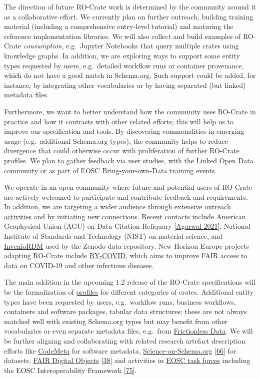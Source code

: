 The direction of future RO-Crate work is determined by the community
around it as a collaborative effort. We currently plan on further
outreach, building training material (including a comprehensive
entry-level tutorial) and maturing the reference implementation
libraries. We will also collect and build examples of RO-Crate
\emph{consumption}, e.g.~Jupyter Notebooks that query multiple crates
using knowledge graphs. In addition, we are exploring ways to support
some entity types requested by users, e.g.~detailed workflow runs or
container provenance, which do not have a good match in Schema.org. Such
support could be added, for instance, by integrating other vocabularies
or by having separated (but linked) metadata files.

Furthermore, we want to better understand how the community uses
RO-Crate in practice and how it contrasts with other related efforts;
this will help us to improve our specification and tools. By discovering
commonalities in emerging usage (e.g.~additional Schema.org types), the
community helps to reduce divergence that could otherwise occur with
proliferation of further RO-Crate profiles. We plan to gather feedback
via user studies, with the Linked Open Data community or as part of EOSC
Bring-your-own-Data training events.

We operate in an open community where future and potential users of
RO-Crate are actively welcomed to participate and contribute feedback
and requirements. In addition, we are targeting a wider audience through
extensive
\href{https://www.researchobject.org/ro-crate/outreach.html}{outreach
activities} and by initiating new connections. Recent contacts include
American Geophysical Union (AGU) on Data Citation Reliquary
{[}\href{https://doi.org/10.5281/zenodo.4916734}{Agarwal 2021}{]}, National
Institute of Standards and Technology (NIST) on material science, and
\href{https://inveniosoftware.org/products/rdm/}{InvenioRDM} used by the
Zenodo data repository. New Horizon Europe projects adapting RO-Crate
include \href{https://by-covid.org/}{BY-COVID}, which aims to improve
FAIR access to data on COVID-19 and other infectious diseases.

The main addition in the upcoming 1.2 release of the RO-Crate
specifications will be the formalization of
\href{https://www.researchobject.org/ro-crate/1.2-DRAFT/profiles}{profiles}
for different categories of crates. Additional entity types have been
requested by users, e.g.~workflow runs, business workflows, containers
and software packages, tabular data structures; these are not always
matched well with existing Schema.org types but may benefit from other
vocabularies or even separate metadata files, e.g.~from
\href{https://frictionlessdata.io/}{Frictionless Data}. We will be
further aligning and collaborating with related research artefact
description efforts like \href{https://codemeta.github.io/}{CodeMeta}
for software metadata,
\href{https://science-on-schema.org/}{Science-on-Schema.org}
{[}\href{https://doi.org/10.5281/zenodo.4477164}{66}{]} for datasets,
\href{https://fairdo.org/}{FAIR Digital Objects}
{[}\href{https://doi.org/10.3390/publications8020021}{38}{]} and
activities in \href{https://www.eosc.eu/task-force-faq}{EOSC task
forces} including the EOSC Interoperability Framework
{[}\href{https://doi.org/10.2777/620649}{75}{]}.